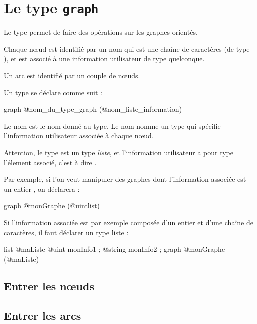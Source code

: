 
\chapter{Le type \texttt{graph}}

Le type  permet de faire des opérations sur les graphes orientés.

Chaque nœud est identifié par un nom qui est une chaîne de caractères (de type ), et est associé à une information utilisateur de type quelconque.

Un arc est identifié par un couple de nœuds.


Un type  se déclare comme suit :
\begin{galgascode}
graph @nom_du_type_graph (@nom_liste_information) {
}
\end{galgascode}

Le nom  est le nom donné au type. Le nom  nomme un type qui spécifie l'information utilisateur associée à chaque nœud.

Attention, le type  est un type \emph{liste}, et l'information utilisateur a pour type l'élement associé, c'est à dire . 

Par exemple, si l'on veut manipuler des graphes dont l'information associée est un entier , on déclarera :
\begin{galgascode}
graph @monGraphe (@uintlist) {
}
\end{galgascode}

Si l'information associée est par exemple composée d'un entier et d'une chaîne de caractères, il faut déclarer un type liste :
\begin{galgascode}
list @maListe {
  @uint monInfo1 ;
  @string monInfo2 ;
}
graph @monGraphe (@maListe) {
}
\end{galgascode}






\section{Entrer les nœuds}



\section{Entrer les arcs}





